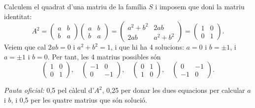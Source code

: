 \begin{apartats}
\begin{solucio}
Calculem el quadrat d'una matriu de la família $S$ i imposem que doni la matriu identitat:
\[
A^2=\begin{pmatrix}a&b\\b&a\end{pmatrix}\begin{pmatrix}a&b\\b&a\end{pmatrix}=\begin{pmatrix}a^2+b^2&2ab\\2ab&a^2+b^2\end{pmatrix}
=\begin{pmatrix}1&0\\0&1\end{pmatrix}.
\]
Veiem que cal $2ab=0$ i $a^2+b^2=1$, i que hi ha 4 solucions: $a=0$ i $b=\pm1$, i $a=\pm1$ i $b=0$. Per tant, les 4
matrius possibles són
\[
\begin{pmatrix}1&0\\0&1\end{pmatrix},\quad\begin{pmatrix}-1&0\\0&-1\end{pmatrix},\quad
\begin{pmatrix}0&1\\1&0\end{pmatrix},\quad\begin{pmatrix}0&-1\\-1&0\end{pmatrix}.
\]

\textit{Pauta oficial:} 0,5 pel càlcul d'$A^2$, 0,25 per donar les dues equacions per calcular $a$ i $b$, i 0,5 per
les quatre matrius que són solució.
\end{solucio}

\end{apartats}
